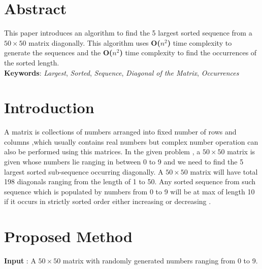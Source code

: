 \documentclass[twocolumn]{article}      %
\begin{document}
\maketitle                   %



\section{Abstract} 
This paper introduces an algorithm to find the 5 largest sorted sequence from a $50\times50$ matrix diagonally. This algorithm uses \textbf{O($n^2$)} time complexity to generate the sequences and the \textbf{O($n^2$)} time complexity to find the occurrences of the sorted length. \\
\textbf{Keywords}: \textit{Largest}, \textit{Sorted}, \textit{Sequence}, \textit{Diagonal of  the Matrix}, \textit{Occurrences}
\section{Introduction}
A matrix is collections of numbers arranged into fixed number of rows and columns ,which usually contains real numbers but complex number operation can also be performed using this matrices. In the given problem , a $50\times50$ matrix is given whose numbers lie ranging in between 0 to 9 and we need to find the 5 largest sorted sub-sequence occurring diagonally.
A $50\times50$ matrix will have total 198 diagonals ranging from the length of 1 to 50. Any sorted sequence from such sequence which is populated by numbers from 0 to 9 will be at max of length 10 if it occurs in strictly sorted order either increasing or decreasing . 
\section{Proposed Method}
\textbf{Input} : A $50\times50$ matrix with randomly generated numbers ranging from 0 to 9.
\end{document}

